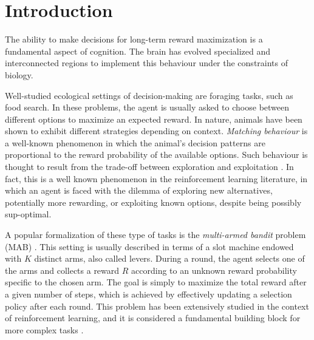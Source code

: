 
\section{Introduction}

The ability to make decisions for long-term reward maximization is a fundamental aspect of cognition. The brain has evolved specialized and interconnected regions to implement this behaviour under the constraints of biology.

Well-studied ecological settings of decision-making are foraging tasks, such as food search. In these problems, the agent is usually asked to choose between different options to maximize an expected reward.
In nature, animals have been shown to exhibit different strategies depending on context.
\textit{Matching behaviour} is a well-known phenomenon in which the animal's decision patterns are proportional to the reward probability of the available options.
Such behaviour is thought to result from the trade-off between exploration and exploitation \cite{suttonReinforcementLearningProblem1998, nivEvolutionReinforcementLearning2002}.
In fact, this is a well known phenomenon in the reinforcement learning literature, in which an agent is faced with the dilemma of exploring new alternatives, potentially more rewarding, or exploiting known options, despite being possibly sup-optimal.

A popular formalization of these type of tasks is the \textit{multi-armed bandit} problem (MAB) \cite{averbeckTheoryChoiceBandit2015}. This setting is usually described in terms of a slot machine endowed with $K$ distinct arms, also called levers.
During a round, the agent selects one of the arms and collects a reward $R$ according to an unknown reward probability specific to the chosen arm.
The goal is simply to maximize the total reward after a given number of steps, which is achieved by effectively updating a selection policy after each round.
This problem has been extensively studied in the context of reinforcement learning, and it is considered a fundamental building block for more complex tasks \cite{suttonReinforcementLearningProblem1998}.


